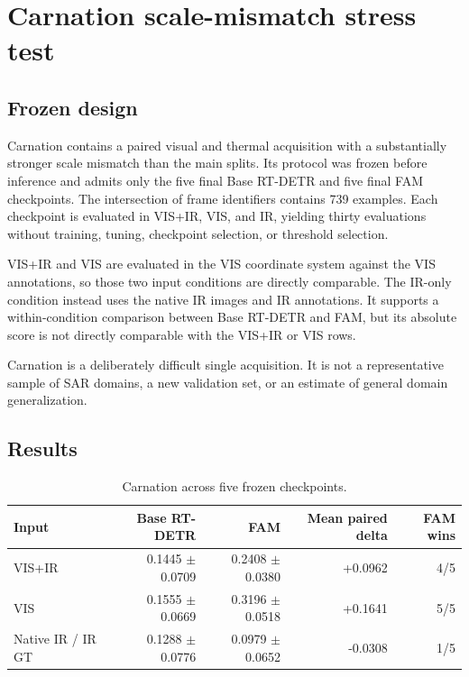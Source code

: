 \section{Carnation scale-mismatch stress test}
\label{sec:carnation}

\subsection{Frozen design}

Carnation contains a paired visual and thermal acquisition with a substantially
stronger scale mismatch than the main splits. Its protocol was frozen before
inference and admits only the five final Base RT-DETR and five final FAM
checkpoints. The intersection of frame identifiers contains 739 examples.
Each checkpoint is evaluated in VIS+IR, VIS, and IR, yielding thirty
evaluations without training, tuning, checkpoint selection, or threshold
selection.

VIS+IR and VIS are evaluated in the VIS coordinate system against the VIS
annotations, so those two input conditions are directly comparable. The
IR-only condition instead uses the native IR images and IR annotations. It
supports a within-condition comparison between Base RT-DETR and FAM, but its
absolute score is not directly comparable with the VIS+IR or VIS rows.

Carnation is a deliberately difficult single acquisition. It is not a
representative sample of SAR domains, a new validation set, or an estimate of
general domain generalization.

\subsection{Results}

\begin{table}[htbp]
  \centering
  \caption{Carnation \mapfifty{} across five frozen checkpoints.}
  \label{tab:carnation-results}
  \begin{tabular}{lrrrr}
    \toprule
    Input & Base RT-DETR & FAM & Mean paired delta & FAM wins \\
    \midrule
    VIS+IR & 0.1445 \(\pm\) 0.0709 & 0.2408 \(\pm\) 0.0380 & +0.0962 & 4/5 \\
    VIS & 0.1555 \(\pm\) 0.0669 & 0.3196 \(\pm\) 0.0518 & +0.1641 & 5/5 \\
    Native IR / IR GT & 0.1288 \(\pm\) 0.0776 & 0.0979 \(\pm\) 0.0652 & -0.0308 & 1/5 \\
    \bottomrule
  \end{tabular}
\end{table}


